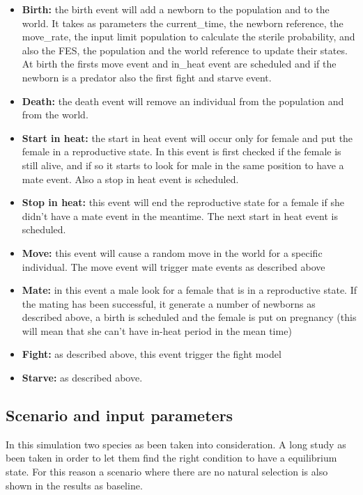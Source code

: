 \documentclass[conference]{IEEEtran}
\begin{document}
    \begin{itemize}
        \item \textbf{Birth:} the birth event will add a newborn to the population and to the world. It takes as parameters the current\_time, the newborn reference, the move\_rate, the input limit population to calculate the sterile probability, and also the FES, the population and the world reference to update their states. At birth the firsts move event and in\_heat event are scheduled and if the newborn is a predator also the first fight and starve event. 
        \item \textbf{Death:} the death event will remove an individual from the population and from the world.
        \item \textbf{Start in heat:} the start in heat event will occur only for female and put the female in a reproductive state. In this event is first checked if the female is still alive, and if so it starts to look for male in the same position to have a mate event. Also a stop in heat event is scheduled.
        \item \textbf{Stop in heat:} this event will end the reproductive state for a female if she didn't have a mate event in the meantime. The next start in heat event is scheduled.
        \item \textbf{Move:} this event will cause a random move in the world for a specific individual. The move event will trigger mate events as described above
        \item \textbf{Mate:} in this event a male look for a female that is in a reproductive state. If the mating has been successful, it generate a number of newborns as described above, a birth is scheduled and the female is put on pregnancy (this will mean that she can't have in-heat period in the mean time)
        \item \textbf{Fight:} as described above, this event trigger the fight model
        \item \textbf{Starve:} as described above.
    \end{itemize}

\subsection{Scenario and input parameters}

    In this simulation two species as been taken into consideration. A long study as been taken in order to let them find the right condition to have a equilibrium state. For this reason a scenario where there are no natural selection is also shown in the results as baseline.
    
\end{document}
